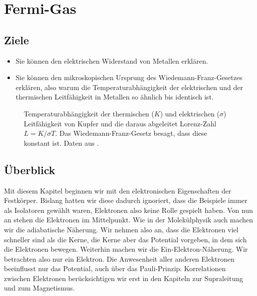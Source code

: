 \renewcommand{\chapterauthors}{Markus Lippitz}
\renewcommand{\lastmod}{25. April 2023}

\chapter{Fermi-Gas}




\section{Ziele}
 


\begin{itemize}  
\item Sie können den elektrischen Widerstand von Metallen erklären.
\item Sie können den mikroskopischen  Ursprung des Wiedemann-Franz-Gesetzes erklären, also warum die Temperaturabhängigkeit der elektrischen und  der thermischen Leitfähigkeit in Metallen so ähnlich bis identisch ist.

\end{itemize}

\begin{figure}
    \caption{Temperaturabhängigkeit der thermischen ($K$) und elektrischen ($\sigma$) Leitfähigkeit von Kupfer und die daraus abgeleitet Lorenz-Zahl $L = K/ \sigma T$. Das Wiedemann-Franz-Gesetz besagt, dass diese konstant ist. 
        Daten aus \cite{Hust1984}. \label{fig:2_Cu_Lorenz}}
\end{figure} 

\section{Überblick}

Mit diesem Kapitel beginnen wir mit den elektronischen Eigenschaften der Festkörper. Bislang hatten wir diese dadurch ignoriert, dass die Beispiele immer als Isolatoren gewählt waren, Elektronen also keine Rolle gespielt haben. Von nun an stehen die Elektronen im Mittelpunkt. Wie in der Molekülphysik auch machen wir die adiabatische Näherung. Wir nehmen also an, dass die Elektronen viel schneller sind als die Kerne, die Kerne aber das Potential vorgeben, in dem sich die Elektronen bewegen. Weiterhin machen wir die Ein-Elektron-Näherung. Wir betrachten also nur ein Elektron. Die Anwesenheit aller anderen Elektronen beeinflusst nur das Potential, auch über das Pauli-Prinzip. Korrelationen zwischen Elektronen berücksichtigen wir  erst in den Kapiteln zur Supraleitung und zum Magnetismus.

